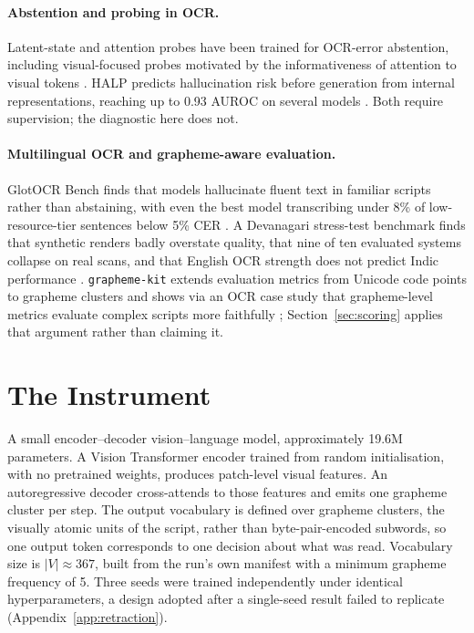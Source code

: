 \documentclass{article}
\begin{document}
\paragraph{Abstention and probing in OCR.} Latent-state and attention probes have been trained
for OCR-error abstention, including visual-focused probes motivated by the informativeness of
attention to visual tokens \citep{yao2025abstain}. HALP predicts hallucination risk
before generation from internal representations, reaching up to 0.93 AUROC on several models
\citep{kogilathota2026halp}. Both require supervision; the diagnostic here does not.

\paragraph{Multilingual OCR and grapheme-aware evaluation.} GlotOCR Bench finds that models
hallucinate fluent text in familiar scripts rather than abstaining, with even the best model
transcribing under 8\% of low-resource-tier sentences below 5\% CER
\citep{kargaran2026glotocr}. A Devanagari stress-test benchmark finds that synthetic renders
badly overstate quality, that nine of ten evaluated systems collapse on real scans, and that
English OCR strength does not predict Indic performance \citep{singh2026devanagari}.
\texttt{grapheme-kit} extends evaluation metrics from Unicode code points to grapheme clusters
and shows via an OCR case study that grapheme-level metrics evaluate complex scripts more
faithfully \citep{nisfer2026graphemekit}; Section~\ref{sec:scoring} applies that argument
rather than claiming it.

\section{The Instrument}

A small encoder--decoder vision--language model, approximately 19.6M parameters. A Vision
Transformer encoder trained from random initialisation, with no pretrained weights, produces
patch-level visual features. An autoregressive decoder cross-attends to those features and
emits one grapheme cluster per step. The output vocabulary is defined over grapheme clusters,
the visually atomic units of the script, rather than byte-pair-encoded subwords, so one output
token corresponds to one decision about what was read. Vocabulary size is $|V| \approx 367$, built from
the run's own manifest with a minimum grapheme frequency of 5. Three seeds were trained
independently under identical hyperparameters, a design adopted after a single-seed result
failed to replicate (Appendix~\ref{app:retraction}).
\end{document}
